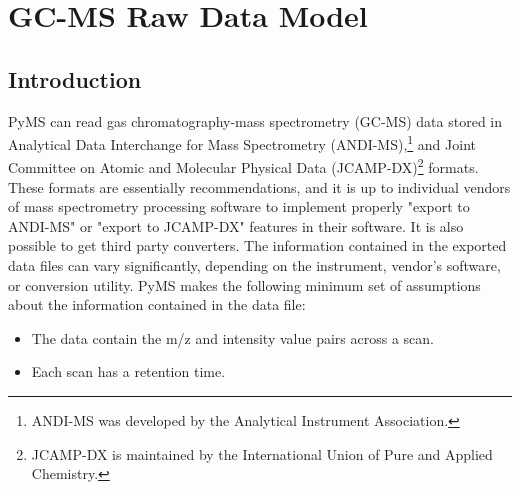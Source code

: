 

\chapter{GC-MS Raw Data Model}

\section{\label{sec:chapter2-introduction}Introduction}

PyMS can read gas chromatography-mass spectrometry (GC-MS) data stored in
Analytical Data Interchange for Mass Spectrometry (ANDI-MS),\footnote{ANDI-MS
was developed by the Analytical Instrument Association.} and Joint Committee on
Atomic and Molecular Physical Data (JCAMP-DX)\footnote{JCAMP-DX is maintained by
the International Union of Pure and Applied Chemistry.} formats. These formats
are essentially recommendations, and it is up to individual vendors of mass
spectrometry processing software to implement properly "export to ANDI-MS"
or "export to JCAMP-DX" features in their software. It is also possible to
get third party converters. The information contained in the exported data files
can vary significantly, depending on the instrument, vendor's software, or
conversion utility. PyMS makes the following  minimum set of assumptions
about the information contained in the data file:

\begin{itemize}
 \item The data contain the m/z and intensity value pairs across a scan.
 \item Each scan has a retention time.
\end{itemize}

